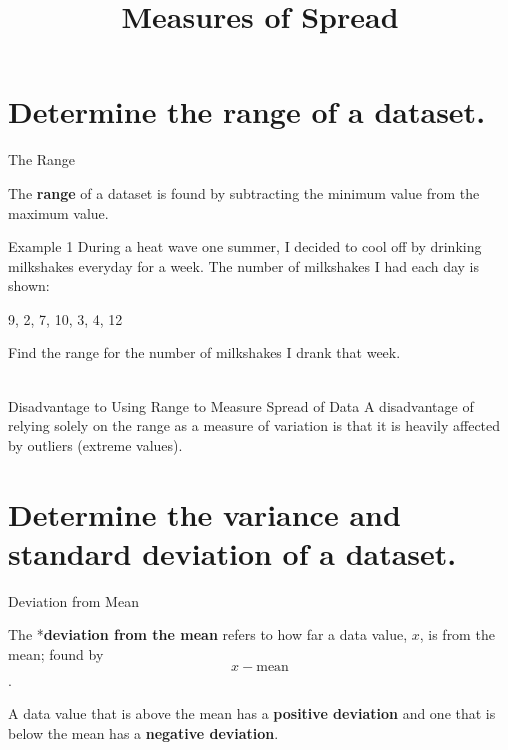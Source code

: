 \documentclass[t]{beamer}
\title{Measures of Spread}
\author{}
\date{}
\begin{document}
\begin{frame} 
\maketitle
\end{frame}


\section{Determine the range of a dataset.}

\begin{frame}{The Range}
\begin{tcolorbox}[colframe=green!20!black, colback = green!30!white,title=\textbf{Range}]
The \textbf{range} of a dataset is found by subtracting the minimum value from the maximum value.
\end{tcolorbox}
\end{frame}

\begin{frame}{Example 1}
During a heat wave one summer, I decided to cool off by drinking milkshakes everyday for a week. The number of milkshakes I had each day is shown:	
\begin{center}
9, 2, 7, 10, 3, 4, 12
\end{center}

Find the range for the number of milkshakes I drank that week.	\newline\\
	\quad	{}	\newline\\
\end{frame}

\begin{frame}{Disadvantage to Using Range to Measure Spread of Data}
A disadvantage of relying solely on the range as a measure of variation is that it is heavily affected by outliers (extreme values).
\end{frame}

\section{Determine the variance and standard deviation of a dataset.}

\begin{frame}{Deviation from Mean}
\begin{tcolorbox}[colframe=green!20!black, colback = green!30!white,title=\textbf{Deviation from the Mean}]
The *\textbf{deviation from the mean} refers to how far a data value, $x$, is from the mean; found by \[x - \text{mean}\].
\end{tcolorbox}
\vspace{11pt}	\pause

A data value that is above the mean has a {\color{blue}\textbf{positive deviation}} and one that is below the mean has a {\color{red}\textbf{negative deviation}}.
\end{frame}
\end{document}

